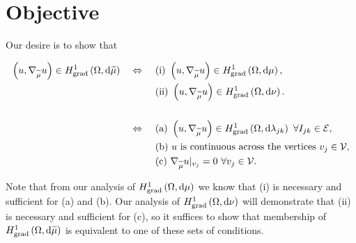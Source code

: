 \documentclass[11pt]{report}
\begin{document}
\section{Objective}
Our desire is to show that
\begin{conjecture} \label{conj:ThickVertexSpaceCharacterisation}
	\begin{align*}
		\left( u, \nabla_{\widetilde{\mu}}u \right)\in H^1_\mathrm{grad}\left( \Omega, \mathrm{d}\widetilde{\mu} \right) \quad\Leftrightarrow\quad
		& \ \text{(i)} \ \left( u, \nabla_{\widetilde{\mu}}u \right)\in H^1_\mathrm{grad}\left( \Omega, \mathrm{d}\mu \right), \\
		& \ \text{(ii)} \ \left( u, \nabla_{\widetilde{\mu}}u \right)\in H^1_\mathrm{grad}\left( \Omega, \mathrm{d}\nu \right). \\
		\\
		\quad\Leftrightarrow\quad
		& \ \text{(a)} \ \left( u, \nabla_{\widetilde{\mu}}u \right)\in H^1_\mathrm{grad}\left( \Omega, \mathrm{d}\lambda_{jk} \right) \ \forall I_{jk}\in\mathcal{E}, \\
		& \ \text{(b)} \ u \text{ is continuous across the vertices} \ v_j\in\mathcal{V}, \\
		& \ \text{(c)} \ \nabla_{\widetilde{\mu}}u\vert_{v_j} = 0 \ \forall v_j\in\mathcal{V}.
	\end{align*}
\end{conjecture}
Note that from our analysis of $H^1_\mathrm{grad}\left( \Omega, \mathrm{d}\mu \right)$ we know that (i) is necessary and sufficient for (a) and (b).
Our analysis of $H^1_\mathrm{grad}\left( \Omega, \mathrm{d}\nu \right)$ will demonstrate that (ii) is necessary and sufficient for (c), so it suffices to show that membership of $H^1_\mathrm{grad}\left( \Omega, \mathrm{d}\widetilde{\mu} \right)$ is equivalent to one of these sets of conditions.
\end{document}
